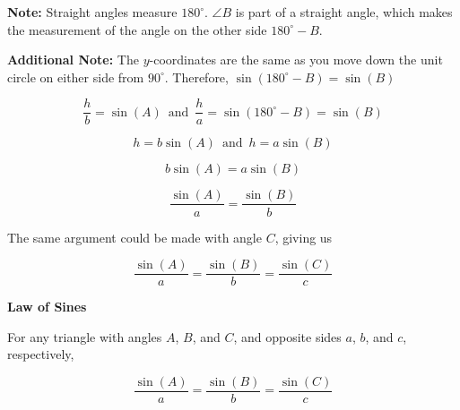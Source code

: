 \documentclass{ximera}
\begin{document}
\textbf{Note:}  Straight angles measure $180^{\circ}$.  $\angle B$ is part of a straight angle, which makes the measurement of the angle on the other side $180^{\circ} - B$. 

\textbf{Additional Note:} The $y$-coordinates are the same as you move down the unit circle on either side from $90^{\circ}$.  Therefore, $\sin(180^{\circ} - B) = \sin(B)$ 




\[    \frac{h}{b} = \sin(A)   \, \text{ and } \,    \frac{h}{a} = \sin(180^{\circ} - B)  = \sin(B)      \]



\[    h = b \sin(A)      \, \text{ and } \,    h = a \sin(B)    \]

\[     b \sin(A)  = a \sin(B)    \]


\[    \frac{\sin(A)}{a} = \frac{\sin(B)}{b}      \]




The same argument could be made with angle $C$, giving us








\[    \frac{\sin(A)}{a} = \frac{\sin(B)}{b}  = \frac{\sin(C)}{c}    \]






\begin{theorem}  \textbf{\textcolor{-red!75!green}{Law of Sines}} 



For any triangle with angles $A$, $B$, and $C$, and opposite sides $a$, $b$, and $c$, respectively, 


\[    \frac{\sin(A)}{a} = \frac{\sin(B)}{b}  = \frac{\sin(C)}{c}    \]


\end{theorem}
\end{document}
